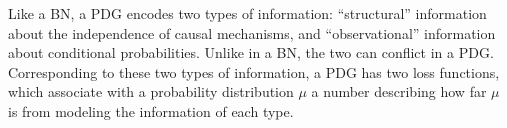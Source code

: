 \documentclass{article}
\newcommand\discard[1]{}
\begin{document}
Like a BN, a PDG encodes
two types of information: ``structural'' 
information about the independence of causal mechanisms,
and ``observational'' information
about conditional probabilities.
Unlike in a BN, the two can conflict in a PDG. 
Corresponding to these two types of information,
a PDG has
two loss functions,
which associate with a probability distribution $\mu$
a number describing 
how far $\mu$ is from 
modeling the information of each type.
\discard{
    Given a weight $\gamma \in [0,\infty)$,
    we take the \emph{$\gamma$-semantics} of a PDG to be the
    set of distributions that minimize the observational loss function
    plus $\gamma$ times the structural loss function.
    We can also consider the \emph{$*$-semantics}, which, roughly speaking,
    is the limit of $ \gamma$-semantics as $\gamma$ goes to 0 (so amounts to focusing on
    the observational loss, using the structural loss only to break
    ties).  This gives us a family of inference notions, parameterized
    by $\gamma$ (or $*$), depending on how we choose to weight the loss
    function. 
}
\end{document}
